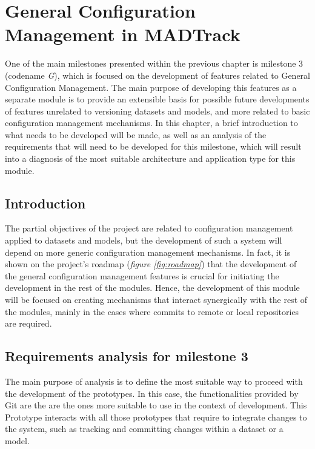 \chapter{General Configuration Management in MADTrack}\label{cap:Milestone3}

One of the main milestones presented within the previous chapter is milestone 3 (codename \emph{G}), which is focused on the development of features related to General
Configuration Management. The main purpose of developing this features as a separate module is to provide an extensible basis for possible future developments of features
unrelated to versioning datasets and models, and more related to basic configuration management mechanisms. In this chapter, a brief introduction to what needs to be developed
will be made, as well as an analysis of the requirements that will need to be developed for this milestone, which will result into a diagnosis of the most suitable architecture
and application type for this module.

\section{Introduction}

The partial objectives of the project are related to configuration management applied to datasets and models, but the development of such a system will depend on more generic
configuration management mechanisms. In fact, it is shown on the project's roadmap (\emph{figure \ref{fig:roadmap}}) that the development of the general configuration management
features is crucial for initiating the development in the rest of the modules. Hence, the development of this module will be focused on creating mechanisms that interact
synergically with the rest of the modules, mainly in the cases where commits to remote or local repositories are required.

\section{Requirements analysis for milestone 3}

The main purpose of analysis is to define the most suitable way to proceed with the development of the prototypes. In this case, the functionalities provided by Git are the 
are the ones more suitable to use in the context of development. This Prototype interacts with all those prototypes that require to integrate changes to the system, such as 
tracking and committing changes within a dataset or a model.

